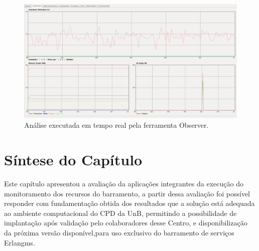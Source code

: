 \begin{figure}[H]
    \centering
    \includegraphics[scale = 0.33]{img/Observer_ErlangMS_sem_SNMP.png}
    \caption{Análise executada em tempo real pela ferramenta Observer.}
    \label{fun:fig:Observer_ErlangMS_sem_SNMP}
\end{figure}


 

\section{Síntese do Capítulo}
\label{sintese5}

Este capítulo apresentou a avaliação da aplicações integrantes da execução do monitoramento dos recursos do barramento, a partir dessa avaliação foi possível responder com fundamentação obtida dos resultados que a solução está adequada ao ambiente computacional do \acrshort{CPD} da \acrshort{UnB}, permitindo a possibilidade de implantação após validação pelo colaboradores desse Centro, e disponibilização da próxima versão disponível,para uso exclusivo do barramento de serviços Erlangms.